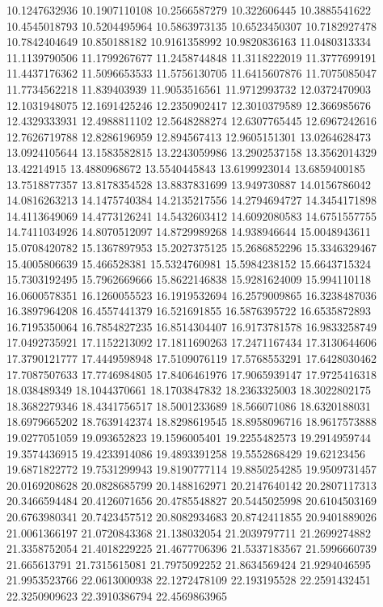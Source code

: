 \documentclass[draft=on]{scrbook}
\begin{document}
10.1247632936
10.1907110108
10.2566587279
10.322606445
10.3885541622
10.4545018793
10.5204495964
10.5863973135
10.6523450307
10.7182927478
10.7842404649
10.850188182
10.9161358992
10.9820836163
11.0480313334
11.1139790506
11.1799267677
11.2458744848
11.3118222019
11.3777699191
11.4437176362
11.5096653533
11.5756130705
11.6415607876
11.7075085047
11.7734562218
11.839403939
11.9053516561
11.9712993732
12.0372470903
12.1031948075
12.1691425246
12.2350902417
12.3010379589
12.366985676
12.4329333931
12.4988811102
12.5648288274
12.6307765445
12.6967242616
12.7626719788
12.8286196959
12.894567413
12.9605151301
13.0264628473
13.0924105644
13.1583582815
13.2243059986
13.2902537158
13.3562014329
13.42214915
13.4880968672
13.5540445843
13.6199923014
13.6859400185
13.7518877357
13.8178354528
13.8837831699
13.949730887
14.0156786042
14.0816263213
14.1475740384
14.2135217556
14.2794694727
14.3454171898
14.4113649069
14.4773126241
14.5432603412
14.6092080583
14.6751557755
14.7411034926
14.8070512097
14.8729989268
14.938946644
15.0048943611
15.0708420782
15.1367897953
15.2027375125
15.2686852296
15.3346329467
15.4005806639
15.466528381
15.5324760981
15.5984238152
15.6643715324
15.7303192495
15.7962669666
15.8622146838
15.9281624009
15.994110118
16.0600578351
16.1260055523
16.1919532694
16.2579009865
16.3238487036
16.3897964208
16.4557441379
16.521691855
16.5876395722
16.6535872893
16.7195350064
16.7854827235
16.8514304407
16.9173781578
16.9833258749
17.0492735921
17.1152213092
17.1811690263
17.2471167434
17.3130644606
17.3790121777
17.4449598948
17.5109076119
17.5768553291
17.6428030462
17.7087507633
17.7746984805
17.8406461976
17.9065939147
17.9725416318
18.038489349
18.1044370661
18.1703847832
18.2363325003
18.3022802175
18.3682279346
18.4341756517
18.5001233689
18.566071086
18.6320188031
18.6979665202
18.7639142374
18.8298619545
18.8958096716
18.9617573888
19.0277051059
19.093652823
19.1596005401
19.2255482573
19.2914959744
19.3574436915
19.4233914086
19.4893391258
19.5552868429
19.62123456
19.6871822772
19.7531299943
19.8190777114
19.8850254285
19.9509731457
20.0169208628
20.0828685799
20.1488162971
20.2147640142
20.2807117313
20.3466594484
20.4126071656
20.4785548827
20.5445025998
20.6104503169
20.6763980341
20.7423457512
20.8082934683
20.8742411855
20.9401889026
21.0061366197
21.0720843368
21.138032054
21.2039797711
21.2699274882
21.3358752054
21.4018229225
21.4677706396
21.5337183567
21.5996660739
21.665613791
21.7315615081
21.7975092252
21.8634569424
21.9294046595
21.9953523766
22.0613000938
22.1272478109
22.193195528
22.2591432451
22.3250909623
22.3910386794
22.4569863965
\end{document}
